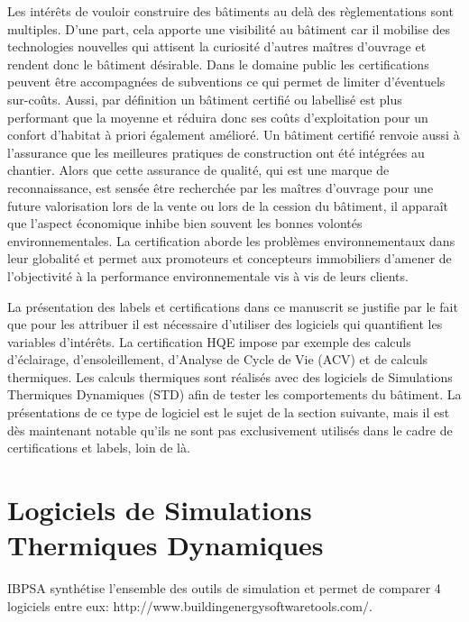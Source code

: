 Les intérêts de vouloir construire des bâtiments au delà des règlementations sont multiples. D'une part, cela apporte une visibilité au bâtiment car il mobilise des technologies nouvelles qui attisent la curiosité d'autres maîtres d'ouvrage et rendent donc le bâtiment désirable. Dans le domaine public les certifications peuvent être accompagnées de subventions ce qui permet de limiter d'éventuels sur-coûts. Aussi, par définition un bâtiment certifié ou labellisé est plus performant que la moyenne et réduira donc ses coûts d'exploitation pour un confort d'habitat à priori également amélioré. Un bâtiment certifié renvoie aussi à l'assurance que les meilleures pratiques de construction ont été intégrées au chantier. Alors que cette assurance de qualité, qui est une marque de reconnaissance, est sensée être recherchée par les maîtres d'ouvrage pour une future valorisation lors de la vente ou lors de la cession du bâtiment, il apparaît que l'aspect économique inhibe bien souvent les bonnes volontés environnementales. La certification aborde les problèmes environnementaux dans leur globalité et permet aux promoteurs et concepteurs immobiliers d'amener de l'objectivité à la performance environnementale vis à vis de leurs clients.

La présentation des labels et certifications dans ce manuscrit se justifie par le fait que pour les attribuer il est nécessaire d'utiliser des logiciels qui quantifient les variables d'intérêts. La certification HQE impose par exemple des calculs d'éclairage, d'ensoleillement, d'Analyse de Cycle de Vie (ACV) et de calculs thermiques. Les calculs thermiques sont réalisés avec des logiciels de Simulations Thermiques Dynamiques (STD) afin de tester les comportements du bâtiment. La présentations de ce type de logiciel est le sujet de la section suivante, mais il est dès maintenant notable qu'ils ne sont pas exclusivement utilisés dans le cadre de certifications et labels, loin de là.

\section{Logiciels de Simulations Thermiques Dynamiques}

IBPSA synthétise l'ensemble des outils de simulation et permet de comparer 4 logiciels entre eux: http://www.buildingenergysoftwaretools.com/.


